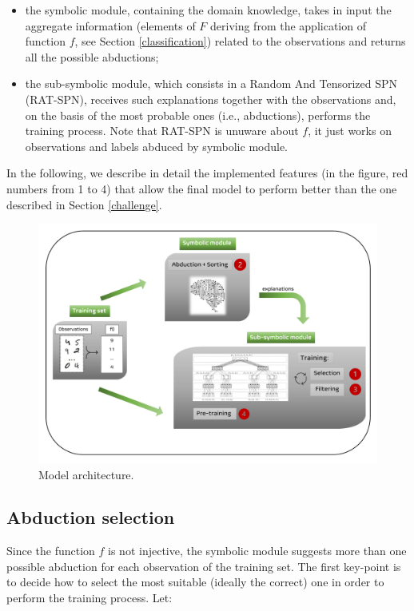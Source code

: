 \begin{itemize}
	\item the symbolic module, containing the domain knowledge, takes in input the aggregate information (elements of $\mathit{F}$ deriving from the application of function $\mathit{f}$, see Section \ref{classification}) related to the observations and returns all the possible abductions;
	\item the sub-symbolic module, which consists in a Random And Tensorized SPN (RAT-SPN), receives such explanations together with the observations and, on the basis of the most probable ones (i.e., abductions), performs the training process. Note that RAT-SPN is unuware about $\mathit{f}$, it just works on observations and labels abduced by symbolic module.
\end{itemize}
In the following, we describe in detail the implemented features (in the figure, red numbers from 1 to 4) that allow the final model to perform better than the one described in Section \ref{challenge}.

\begin{figure}[H]
\caption{Model architecture.}
\label{fig:architecture}
\centering
\includegraphics[scale=0.45]{Figures/architecture.pdf}
\end{figure}

\subsection{Abduction selection}
\label{abd-selection}
Since the function $\mathit{f}$ is not injective, the symbolic module suggests more than one possible abduction for each observation of the training set. The first key-point is to decide how to select the most suitable (ideally the correct) one in order to perform the training process. Let:

